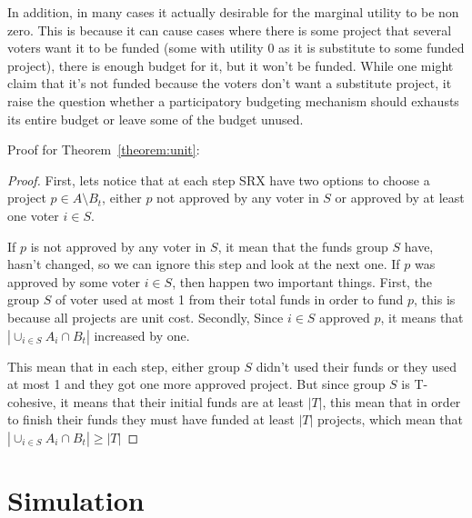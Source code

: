 \documentclass[runningheads]{llncs}
\begin{document}
\begin{subappendices}
In addition, in many cases it actually desirable for the marginal utility to be non zero. This is because it can cause cases where there is some project that several voters want it to be funded (some with utility 0 as it is substitute to some funded project), there is enough budget for it, but it won't be funded. While one might claim that it's not funded because the voters don't want a substitute project, it raise the question whether a participatory budgeting mechanism should exhausts its entire budget or leave some of the budget unused.


Proof for Theorem~\ref{theorem:unit}:

\begin{proof}
First, lets notice that at each step SRX have two options to choose a project $p\in A\setminus B_t$, either $p$ not approved by any voter in $S$ or approved by at least one voter $i\in S$.

If $p$ is  not approved by any voter in $S$, it mean that the funds group $S$ have, hasn't changed, so we can ignore this step and look at the next one. If $p$ was approved by some voter $i\in S$, then happen two important things. First, the group $S$ of voter used at most 1 from their total funds in order to fund $p$, this is because all projects are unit cost. Secondly, Since $i\in S$ approved $p$, it means that $|\cup_{i\in S}A_i\cap B_t|$ increased by one.

This mean that in each step, either group $S$ didn't used their funds or they used at most 1 and they got one more approved project. But since group $S$ is T-cohesive, it means that their initial funds are at least $|T|$, this mean that in order to finish their funds they must have funded at least $|T|$ projects, which mean that $|\cup_{i\in S}A_i\cap B_t|\geq |T|$
\end{proof}

\section{Simulation}\label{app:sim}




\end{subappendices}
\end{document}
